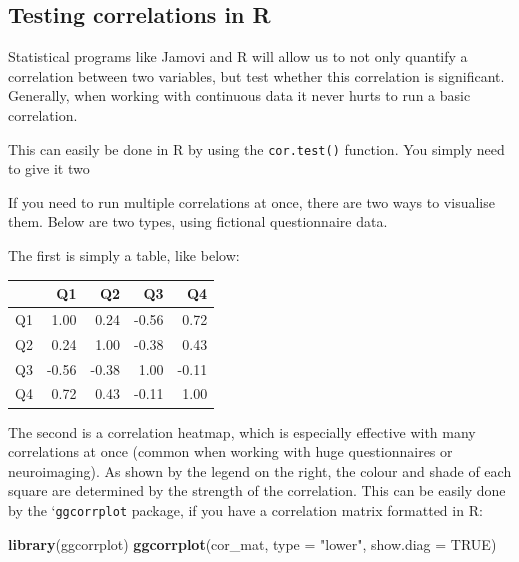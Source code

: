 \documentclass[
]{book}
\newenvironment{Shaded}{\begin{snugshade}}{\end{snugshade}}
\newcommand{\AttributeTok}[1]{\textcolor[rgb]{0.13,0.29,0.53}{#1}}
\newcommand{\ConstantTok}[1]{\textcolor[rgb]{0.56,0.35,0.01}{#1}}
\newcommand{\FunctionTok}[1]{\textcolor[rgb]{0.13,0.29,0.53}{\textbf{#1}}}
\newcommand{\NormalTok}[1]{#1}
\newcommand{\StringTok}[1]{\textcolor[rgb]{0.31,0.60,0.02}{#1}}
\begin{document}
\subsection{Testing correlations in R}\label{testing-correlations-in-r}

Statistical programs like Jamovi and R will allow us to not only quantify a correlation between two variables, but test whether this correlation is significant. Generally, when working with continuous data it never hurts to run a basic correlation.

This can easily be done in R by using the \texttt{cor.test()} function. You simply need to give it two

If you need to run multiple correlations at once, there are two ways to visualise them. Below are two types, using fictional questionnaire data.

The first is simply a table, like below:

\begin{tabular}{l|r|r|r|r}
\hline
  & Q1 & Q2 & Q3 & Q4\\
\hline
Q1 & 1.00 & 0.24 & -0.56 & 0.72\\
\hline
Q2 & 0.24 & 1.00 & -0.38 & 0.43\\
\hline
Q3 & -0.56 & -0.38 & 1.00 & -0.11\\
\hline
Q4 & 0.72 & 0.43 & -0.11 & 1.00\\
\hline
\end{tabular}

The second is a correlation heatmap, which is especially effective with many correlations at once (common when working with huge questionnaires or neuroimaging). As shown by the legend on the right, the colour and shade of each square are determined by the strength of the correlation. This can be easily done by the `\texttt{ggcorrplot} package, if you have a correlation matrix formatted in R:

\begin{Shaded}
\begin{Highlighting}[]
\FunctionTok{library}\NormalTok{(ggcorrplot)}
\FunctionTok{ggcorrplot}\NormalTok{(cor\_mat, }\AttributeTok{type =} \StringTok{"lower"}\NormalTok{, }\AttributeTok{show.diag =} \ConstantTok{TRUE}\NormalTok{)}
\end{Highlighting}
\end{Shaded}
\end{document}
